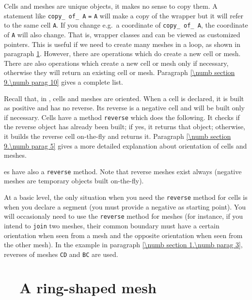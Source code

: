 Cells and meshes are unique objects, it makes no sense to copy them.
A statement like {\small\tt {}} {\small\tt copy\_\,of\_\,A} {\small\tt =} {\small\tt A}
will make a copy of the wrapper but it will refer to the same cell {\small\tt A}.
If you change e.g.\ a coordinate of {\small\tt copy\_\,of\_\,A}, the coordinate of {\small\tt A}
will also change.
That is, wrapper classes {\small\tt {}} and {\small\tt {}} can be viewed as
customized pointers.
This is useful if we need to create many meshes in a loop, as shown in paragraph
\ref{\numb section 9.\numb parag 2}.
However, there are operations which do create a new cell or mesh.
There are also operations which create a new cell or mesh only if necessary,
otherwise they will return an existing cell or mesh.
Paragraph \ref{\numb section 9.\numb parag 10} gives a complete list.

Recall that, in \maniFEM, cells and meshes are oriented.
When a cell is declared, it is built as positive and has no reverse.
Its reverse is a negative cell and will be built only if necessary.
Cells have a method {\small\tt reverse} which does the following.
It checks if the reverse object has already been built; if yes, it returns that object;
otherwise, it builds the reverse cell on-the-fly and returns it.
Paragraph \ref{\numb section 9.\numb parag 5} gives a more detailed explanation about
orientation of cells and meshes.

{\small\tt {}}es have also a {\small\tt reverse} method.
Note that reverse meshes exist always (negative meshes are temporary objects built
on-the-fly).

At a basic level, the only situation when you need the {\small\tt reverse} method  for cells is
when you declare a segment {\small\tt {}} (you must provide a negative
{\small\tt {}} as starting point).
You will occasionaly need to use the {\small\tt reverse} method for meshes (for instance, if you
intend to {\small\tt join} two meshes, their common boundary must have a certain orientation when
seen from a mesh and the opposite orientation when seen from the other mesh).
In the example in paragraph \ref{\numb section 1.\numb parag 3},
reverses of meshes {\small\tt CD} and {\small\tt BC} are used.


\section{~~A ring-shaped mesh}\label{\numb section 9.\numb parag 2}

